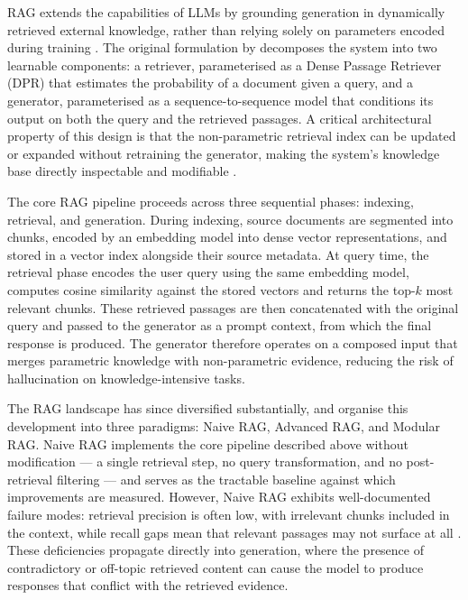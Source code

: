 RAG extends the capabilities of LLMs by grounding generation in dynamically retrieved external knowledge, rather than relying solely on parameters encoded during training \cite{lewis2020rag}. The original formulation by  decomposes the system into two learnable components: a retriever, parameterised as a Dense Passage Retriever (DPR) that estimates the probability of a document given a query, and a generator, parameterised as a sequence-to-sequence model that conditions its output on both the query and the retrieved passages. A critical architectural property of this design is that the non-parametric retrieval index can be updated or expanded without retraining the generator, making the system's knowledge base directly inspectable and modifiable \cite{lewis2020rag}.

The core RAG pipeline proceeds across three sequential phases: indexing, retrieval, and generation. During indexing, source documents are segmented into chunks, encoded by an embedding model into dense vector representations, and stored in a vector index alongside their source metadata. At query time, the retrieval phase encodes the user query using the same embedding model, computes cosine similarity against the stored vectors and returns the top-$k$ most relevant chunks. These retrieved passages are then concatenated with the original query and passed to the generator as a prompt context, from which the final response is produced. The generator therefore operates on a composed input that merges parametric knowledge with non-parametric evidence, reducing the risk of hallucination on knowledge-intensive tasks.

The RAG landscape has since diversified substantially, and  organise this development into three paradigms: Naive RAG, Advanced RAG, and Modular RAG. Naive RAG implements the core pipeline described above without modification — a single retrieval step, no query transformation, and no post-retrieval filtering — and serves as the tractable baseline against which improvements are measured. However, Naive RAG exhibits well-documented failure modes: retrieval precision is often low, with irrelevant chunks included in the context, while recall gaps mean that relevant passages may not surface at all \cite{gao2023ragsurvey}. These deficiencies propagate directly into generation, where the presence of contradictory or off-topic retrieved content can cause the model to produce responses that conflict with the retrieved evidence.

